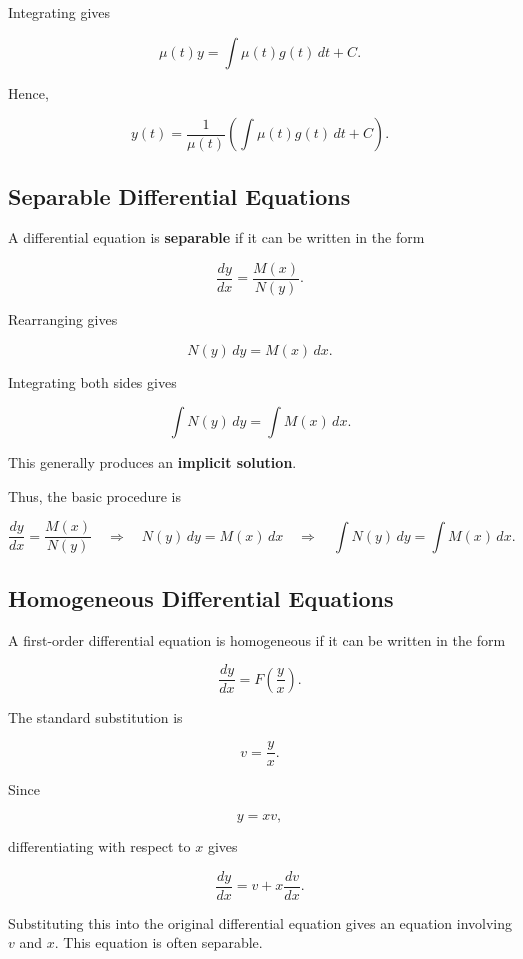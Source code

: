 \documentclass[11pt]{article}
\begin{document}
Integrating gives

\[
\mu(t)y
=
\int \mu(t)g(t)\,dt + C.
\]

Hence,

\[
\boxed{
y(t)
=
\frac{1}{\mu(t)}
\left(
\int \mu(t)g(t)\,dt + C
\right).
}
\]

\subsection{Separable Differential Equations}

A differential equation is \textbf{separable} if it can be written in
the form

\[
\frac{dy}{dx}
=
\frac{M(x)}{N(y)}.
\]

Rearranging gives

\[
N(y)\,dy = M(x)\,dx.
\]

Integrating both sides gives

\[
\int N(y)\,dy
=
\int M(x)\,dx.
\]

This generally produces an \textbf{implicit solution}.

Thus, the basic procedure is

\[
\boxed{
\frac{dy}{dx}
=
\frac{M(x)}{N(y)}
\quad\Longrightarrow\quad
N(y)\,dy=M(x)\,dx
\quad\Longrightarrow\quad
\int N(y)\,dy
=
\int M(x)\,dx.
}
\]

\subsection{Homogeneous Differential Equations}

A first-order differential equation is homogeneous if it can be
written in the form

\[
\frac{dy}{dx}
=
F\left(\frac{y}{x}\right).
\]

The standard substitution is

\[
v=\frac{y}{x}.
\]

Since

\[
y=xv,
\]

differentiating with respect to \(x\) gives

\[
\frac{dy}{dx}
=
v+x\frac{dv}{dx}.
\]

Substituting this into the original differential equation gives an
equation involving \(v\) and \(x\). This equation is often separable.
\end{document}
